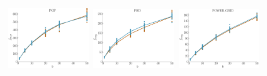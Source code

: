 \documentclass[a4paper]{report}
\newcommand{\wratio}{0.16}
\begin{document}
\includegraphics[width=\wratio\textwidth]{maxcut/PGP/fs_pgp}\hfill
\includegraphics[width=\wratio\textwidth]{maxcut/PHD/fs_phd}\hfill
\vfill
\includegraphics[width=\wratio\textwidth]{maxcut/POWER_GRID/fs_power_grid}\hfill
\end{document}
